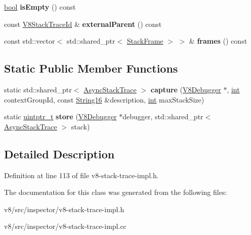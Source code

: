 \begin{DoxyCompactItemize}
\item 
\mbox{\label{classv8__inspector_1_1AsyncStackTrace_a57865357a608280af8217b5add3fdee3}} 
\mbox{\hyperlink{classbool}{bool}} {\bfseries is\+Empty} () const
\item 
\mbox{\label{classv8__inspector_1_1AsyncStackTrace_ab57227517e2972b208685ed1da41907c}} 
const \mbox{\hyperlink{structv8__inspector_1_1V8StackTraceId}{V8\+Stack\+Trace\+Id}} \& {\bfseries external\+Parent} () const
\item 
\mbox{\label{classv8__inspector_1_1AsyncStackTrace_aede3cb9966b7440c9f929bc32a41bdca}} 
const std\+::vector$<$ std\+::shared\+\_\+ptr$<$ \mbox{\hyperlink{classv8__inspector_1_1StackFrame}{Stack\+Frame}} $>$ $>$ \& {\bfseries frames} () const
\end{DoxyCompactItemize}
\subsection*{Static Public Member Functions}
\begin{DoxyCompactItemize}
\item 
\mbox{\label{classv8__inspector_1_1AsyncStackTrace_a3ea40c48caf9c6c1978fa7d023dc299f}} 
static std\+::shared\+\_\+ptr$<$ \mbox{\hyperlink{classv8__inspector_1_1AsyncStackTrace}{Async\+Stack\+Trace}} $>$ {\bfseries capture} (\mbox{\hyperlink{classv8__inspector_1_1V8Debugger}{V8\+Debugger}} $\ast$, \mbox{\hyperlink{classint}{int}} context\+Group\+Id, const \mbox{\hyperlink{classv8__inspector_1_1String16}{String16}} \&description, \mbox{\hyperlink{classint}{int}} max\+Stack\+Size)
\item 
\mbox{\label{classv8__inspector_1_1AsyncStackTrace_a63c53c4a60fa57330bf3849adfd4791f}} 
static \mbox{\hyperlink{classuintptr__t}{uintptr\+\_\+t}} {\bfseries store} (\mbox{\hyperlink{classv8__inspector_1_1V8Debugger}{V8\+Debugger}} $\ast$debugger, std\+::shared\+\_\+ptr$<$ \mbox{\hyperlink{classv8__inspector_1_1AsyncStackTrace}{Async\+Stack\+Trace}} $>$ stack)
\end{DoxyCompactItemize}


\subsection{Detailed Description}


Definition at line 113 of file v8-\/stack-\/trace-\/impl.\+h.



The documentation for this class was generated from the following files\+:\begin{DoxyCompactItemize}
\item 
v8/src/inspector/v8-\/stack-\/trace-\/impl.\+h\item 
v8/src/inspector/v8-\/stack-\/trace-\/impl.\+cc\end{DoxyCompactItemize}
